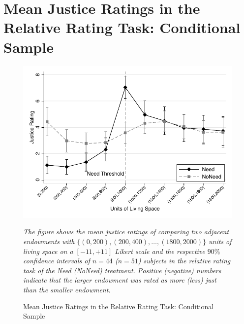 \documentclass[12pt]{scrartcl}
\begin{document}
\section{Mean Justice Ratings in the Relative Rating Task: Conditional Sample}\label{sec:app_conditional_relative}
\begin{figure}[ht!]
   \centering
   \includegraphics{figures/figure_6.pdf}
   \begin{minipage}{\linewidth}
      \footnotesize
      \textit{The figure shows the mean justice ratings of comparing two adjacent endowments with $\{(0,200),(200,400),\ldots,(1800,2000)\}$ units of living space on a $[-11,+11]$ Likert scale and the respective $90\%$ confidence intervals of $n=44$ ($n=51$) subjects in the relative rating task of the Need (NoNeed) treatment. Positive (negative) numbers indicate that the larger endowment was rated as more (less) just than the smaller endowment.}
   \end{minipage}
   \caption{Mean Justice Ratings in the Relative Rating Task: Conditional Sample}
   \label{fig:relative_ratings_conditional}
\end{figure}
\end{document}
